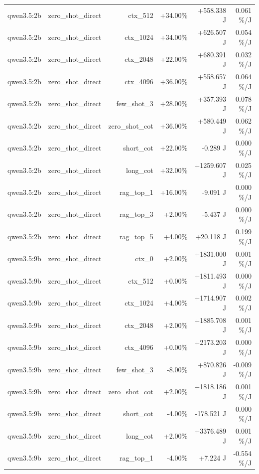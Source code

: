 \begin{table}[t]
\begin{tabular}{lrrrrr}
qwen3.5:2b & zero\_shot\_direct & ctx\_512 & +34.00\% & +558.338 J & 0.061 \%/J \\
qwen3.5:2b & zero\_shot\_direct & ctx\_1024 & +34.00\% & +626.507 J & 0.054 \%/J \\
qwen3.5:2b & zero\_shot\_direct & ctx\_2048 & +22.00\% & +680.391 J & 0.032 \%/J \\
qwen3.5:2b & zero\_shot\_direct & ctx\_4096 & +36.00\% & +558.657 J & 0.064 \%/J \\
qwen3.5:2b & zero\_shot\_direct & few\_shot\_3 & +28.00\% & +357.393 J & 0.078 \%/J \\
qwen3.5:2b & zero\_shot\_direct & zero\_shot\_cot & +36.00\% & +580.449 J & 0.062 \%/J \\
qwen3.5:2b & zero\_shot\_direct & short\_cot & +22.00\% & -0.289 J & 0.000 \%/J \\
qwen3.5:2b & zero\_shot\_direct & long\_cot & +32.00\% & +1259.607 J & 0.025 \%/J \\
qwen3.5:2b & zero\_shot\_direct & rag\_top\_1 & +16.00\% & -9.091 J & 0.000 \%/J \\
qwen3.5:2b & zero\_shot\_direct & rag\_top\_3 & +2.00\% & -5.437 J & 0.000 \%/J \\
qwen3.5:2b & zero\_shot\_direct & rag\_top\_5 & +4.00\% & +20.118 J & 0.199 \%/J \\
qwen3.5:9b & zero\_shot\_direct & ctx\_0 & +2.00\% & +1831.000 J & 0.001 \%/J \\
qwen3.5:9b & zero\_shot\_direct & ctx\_512 & +0.00\% & +1811.493 J & 0.000 \%/J \\
qwen3.5:9b & zero\_shot\_direct & ctx\_1024 & +4.00\% & +1714.907 J & 0.002 \%/J \\
qwen3.5:9b & zero\_shot\_direct & ctx\_2048 & +2.00\% & +1885.708 J & 0.001 \%/J \\
qwen3.5:9b & zero\_shot\_direct & ctx\_4096 & +0.00\% & +2173.203 J & 0.000 \%/J \\
qwen3.5:9b & zero\_shot\_direct & few\_shot\_3 & -8.00\% & +870.826 J & -0.009 \%/J \\
qwen3.5:9b & zero\_shot\_direct & zero\_shot\_cot & +2.00\% & +1818.186 J & 0.001 \%/J \\
qwen3.5:9b & zero\_shot\_direct & short\_cot & -4.00\% & -178.521 J & 0.000 \%/J \\
qwen3.5:9b & zero\_shot\_direct & long\_cot & +2.00\% & +3376.489 J & 0.001 \%/J \\
qwen3.5:9b & zero\_shot\_direct & rag\_top\_1 & -4.00\% & +7.224 J & -0.554 \%/J \\

\end{tabular}
\end{table}

